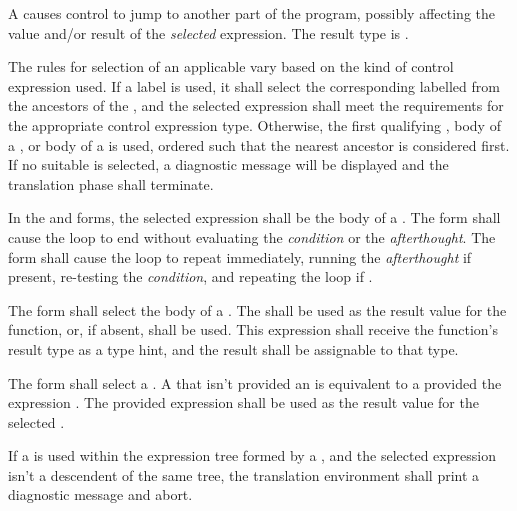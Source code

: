 \specsubsubitem
A  causes control to jump to another part of the
program, possibly affecting the value and/or result of the \textit{selected}
expression. The result type is .

\specsubsubitem
The rules for selection of an applicable  vary based on
the kind of control expression used. If a label is used, it shall select the
corresponding labelled  from the ancestors of
the , and the selected expression shall meet the
requirements for the appropriate control expression type. Otherwise, the first
qualifying , body of a ,
or body of a  is used, ordered such that the
nearest ancestor is considered first. If no suitable  is
selected, a diagnostic message will be displayed and the translation phase shall
terminate.

\specsubsubitem
In the  and  forms, the selected expression
shall be the body of a . The  form shall
cause the loop to end without evaluating the \textit{condition} or the
\textit{afterthought}. The  form shall cause the loop to
repeat immediately, running the \textit{afterthought} if present, re-testing the
\textit{condition}, and repeating the loop if .

\specsubsubitem
The  form shall select the body of a
. The  shall be used
as the result value for the function, or, if absent,  shall be
used. This expression shall receive the function's result type as a type hint,
and the result shall be assignable to that type.

\specsubsubitem
The  form shall select a
. A  that isn't
provided an  is equivalent to a
 provided the expression . The
provided expression shall be used as the result value for the selected
.

\specsubsubitem
If a  is used within the expression tree formed
by a , and the selected expression isn't a
descendent of the same tree, the translation environment shall print a
diagnostic message and abort.

